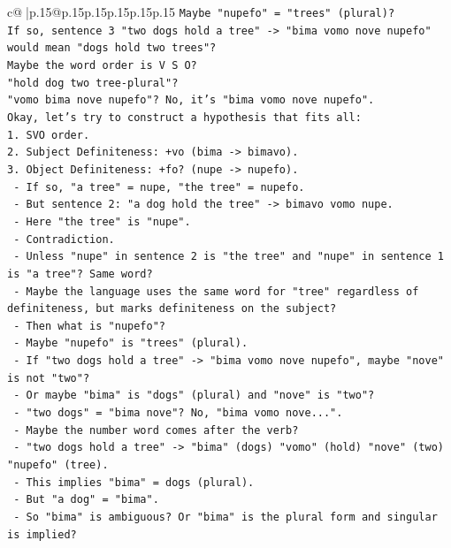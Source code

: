 \documentclass{article}
\begin{document}
{\begin{supertabular}{c@{$\;$}|p{.15\linewidth}@{}p{.15\linewidth}p{.15\linewidth}p{.15\linewidth}p{.15\linewidth}p{.15\linewidth}}
{{{\texttt{Maybe "nupefo" = "trees" (plural)?} \\
\texttt{If so, sentence 3 "two dogs hold a tree" {-}> "bima vomo nove nupefo" would mean "dogs hold two trees"?} \\
\texttt{Maybe the word order is V S O?} \\
\texttt{"hold dog two tree{-}plural"?} \\
\texttt{"vomo bima nove nupefo"? No, it's "bima vomo nove nupefo".} \\
\texttt{Okay, let's try to construct a hypothesis that fits all:} \\
\texttt{1. SVO order.} \\
\texttt{2. Subject Definiteness: +vo (bima {-}> bimavo).} \\
\texttt{3. Object Definiteness: +fo? (nupe {-}> nupefo).} \\
\texttt{   {-} If so, "a tree" = nupe, "the tree" = nupefo.} \\
\texttt{   {-} But sentence 2: "a dog hold the tree" {-}> bimavo vomo nupe.} \\
\texttt{   {-} Here "the tree" is "nupe".} \\
\texttt{   {-} Contradiction.} \\
\texttt{   {-} Unless "nupe" in sentence 2 is "the tree" and "nupe" in sentence 1 is "a tree"? Same word?} \\
\texttt{   {-} Maybe the language uses the same word for "tree" regardless of definiteness, but marks definiteness on the subject?} \\
\texttt{   {-} Then what is "nupefo"?} \\
\texttt{   {-} Maybe "nupefo" is "trees" (plural).} \\
\texttt{   {-} If "two dogs hold a tree" {-}> "bima vomo nove nupefo", maybe "nove" is not "two"?} \\
\texttt{   {-} Or maybe "bima" is "dogs" (plural) and "nove" is "two"?} \\
\texttt{   {-} "two dogs" = "bima nove"? No, "bima vomo nove...".} \\
\texttt{   {-} Maybe the number word comes after the verb?} \\
\texttt{   {-} "two dogs hold a tree" {-}> "bima" (dogs) "vomo" (hold) "nove" (two) "nupefo" (tree).} \\
\texttt{   {-} This implies "bima" = dogs (plural).} \\
\texttt{   {-} But "a dog" = "bima".} \\
\texttt{   {-} So "bima" is ambiguous? Or "bima" is the plural form and singular is implied?} \\
}}}
\end{supertabular}}
\end{document}
